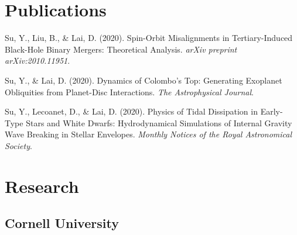 \documentclass[]{yubo-resume-openfont}
\begin{document}
\begin{minipage}[t]{0.66\textwidth}


\section{Publications}
\vspace{\topsep} %
\begin{tightemize}
    \item Su, Y., Liu, B., \& Lai, D. (2020).
        Spin-Orbit Misalignments in Tertiary-Induced Black-Hole Binary Mergers:
        Theoretical Analysis. \emph{arXiv preprint arXiv:2010.11951}.
    \item Su, Y., \& Lai, D. (2020).
        Dynamics of Colombo's Top: Generating Exoplanet Obliquities from
        Planet-Disc Interactions. \emph{The Astrophysical Journal}.
    \item Su, Y., Lecoanet, D., \& Lai, D. (2020).
        Physics of Tidal Dissipation in Early-Type Stars and White Dwarfs:
        Hydrodynamical Simulations of Internal Gravity Wave Breaking in
        Stellar Envelopes. \emph{Monthly Notices of the Royal Astronomical
        Society}.
\end{tightemize}
\sectionsep
\section{Research}

\subsection{Cornell University}
\vspace{\topsep} %
\sectionsep


\end{minipage}
\end{document}
